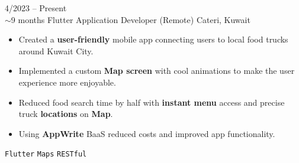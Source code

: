 \documentclass[9pt]{developercv} %
\begin{document}
\vspace{-10 pt}
\begin{entrylist}
	\entry
	{4/2023 -- Present\\\footnotesize{$\sim$9 months}}
	{Flutter Application Developer (Remote)}
	{Cateri, Kuwait}
	{\vspace{-10pt}
		\begin{itemize}[noitemsep,topsep=0pt,parsep=0pt,partopsep=0pt, leftmargin=-1pt]
			\item Created a \textbf{user-friendly} mobile app connecting users to local food trucks around Kuwait City.
			\item Implemented a custom \textbf{Map screen} with cool animations to make the user experience more enjoyable.
			\item Reduced food search time by half with \textbf{instant menu} access and precise truck \textbf{locations} on \textbf{Map}.
			\item Using \textbf{AppWrite} BaaS reduced costs and improved app functionality.
		\end{itemize}
		\texttt{Flutter} \slashsep \texttt{Maps} \slashsep \texttt{RESTful}}


\end{entrylist}
\end{document}

